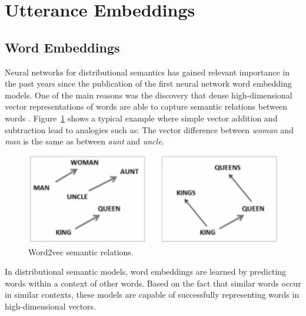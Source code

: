 \section{Utterance Embeddings}\label{sec:utt2vec}

\subsection{Word Embeddings}
Neural networks for distributional semantics has gained relevant importance in the past years since the publication of the first neural network word embedding models.
One of the main reasons was the discovery that dense high-dimensional vector representations of words are able to capture semantic relations between words \cite{mikolov2013efficient}.
Figure~\ref{fig:w2v_example} shows a typical example where simple vector addition and subtraction lead to analogies such as: The vector difference between \textit{woman} and \textit{man} is the same as between \textit{aunt} and \textit{uncle}.


\begin{figure}
\centering
\begin{minipage}{.4\textwidth}
\includegraphics[width=1\textwidth]{img/w2v_example}
\caption{Word2vec semantic relations.}
\label{fig:w2v_example}
\end{minipage}
\end{figure}

In distributional semantic models, word embeddings are learned by predicting words within a context of other words.
Based on the fact that similar words occur in similar contexts, these models are capable of successfully representing words in high-dimensional vectors. 

